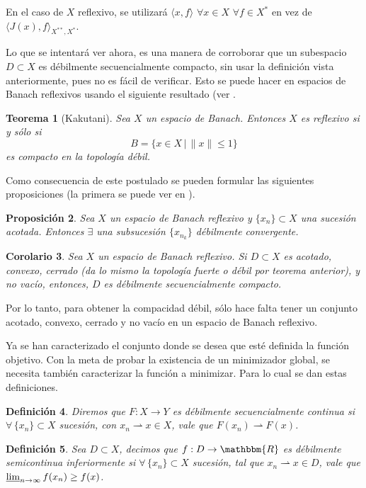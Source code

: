 \documentclass[a4paper,10pt]{book}
\newcommand{\R}{\mathbbm{R}}
\newcommand{\arr}{\rightarrow}
\newcommand{\la}{\langle}
\newcommand{\ra}{\rangle}
\newcommand{\deb}{\rightharpoonup}
\newtheorem{teo}{Teorema}%
\newtheorem{cor}[teo]{Corolario}
\newtheorem{prop}[teo]{Proposici\'on}
\newtheorem{defi}[teo]{Definici\'on}
\begin{document}
En el caso de $X$ reflexivo, se utilizará $\la x,f\ra$ $\forall x\in X$ $\forall f\in X^*$ en vez de $\la J(x),f\ra_{X^{**},X^*}$.

Lo que se intentará ver ahora, es una manera de corroborar que un subespacio $D\subset X$ es débilmente secuencialmente compacto, sin usar la definición vista anteriormente, pues no es fácil de verificar. Esto se puede hacer en espacios de Banach reflexivos usando el siguiente resultado (ver \cite[Theorem 3.17.]{brezis2010functional}.
\begin{teo}[Kakutani]\label{kakutani}
 Sea $X$ un espacio de Banach. Entonces $X$ es reflexivo si y sólo si
 \[
  B=\{x\in X\,|\,\|x\|\leq1\}
 \]
es compacto en la topología débil.
\end{teo}

Como consecuencia de este postulado se pueden formular las siguientes proposiciones (la primera se puede ver en \cite[Theorem 3.18.]{brezis2010functional}).

\begin{prop}
Sea $X$ un espacio de Banach reflexivo y $\{x_n\}\subset X$ una sucesión acotada. Entonces $\exists$ una subsucesión $\{x_{n_k}\}$ débilmente convergente.
\end{prop}


\begin{cor}
Sea $X$ un espacio de Banach reflexivo. Si $D\subset X$ es acotado, convexo, cerrado (da lo mismo la topología fuerte o débil por teorema anterior), y no vacío, entonces, $D$ es débilmente secuencialmente compacto.
\end{cor}

Por lo tanto, para obtener la compacidad débil, sólo hace falta tener un conjunto acotado, convexo, cerrado y no vacío en un espacio de Banach reflexivo.

Ya se han caracterizado el conjunto donde se desea que esté definida la función objetivo. Con la meta de probar la existencia de un minimizador global, se necesita también caracterizar la función a minimizar. Para lo cual se dan estas definiciones.

\begin{defi}
 Diremos que $F:X\arr Y$ es débilmente secuencialmente continua si $\forall\, \{x_n\}\subset X$ sucesión, con $x_n\deb x\in X$, vale que $F(x_n)\deb F(x)$.
\end{defi}

\begin{defi}
 Sea $D\subset X$, decimos que $f:D\arr\R$ es débilmente semicontinua inferiormente si $\forall\, \{x_n\}\subset X$ sucesión, tal que $x_n\deb x\in D$,  vale que $\varliminf_{n \to \infty} f(x_n)\geq f(x)$.
\end{defi}
\end{document}
